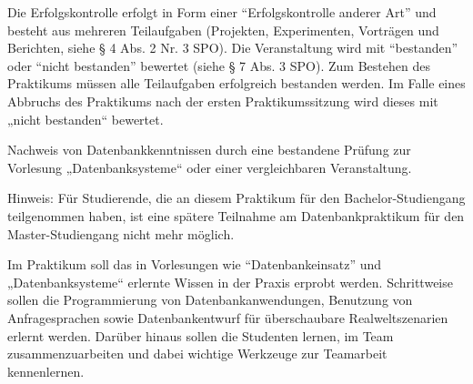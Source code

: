 \begin{course}

\setdoclanguagegerman
{}



\coursehead


\label{cour_14781.dp_997}


\begin{styleenv}
\begin{assessment}
Die Erfolgskontrolle erfolgt in Form einer “Erfolgskontrolle anderer Art” und besteht aus mehreren Teilaufgaben (Projekten, Experimenten, Vorträgen und Berichten, siehe § 4 Abs. 2 Nr. 3 SPO). Die Veranstaltung wird mit “bestanden” oder “nicht bestanden” bewertet (siehe § 7 Abs. 3 SPO). Zum Bestehen des Praktikums müssen alle Teilaufgaben erfolgreich bestanden werden. Im Falle eines Abbruchs des Praktikums nach der ersten Praktikumssitzung wird dieses mit „nicht bestanden“ bewertet.


\end{assessment}

\begin{conditions}Nachweis von Datenbankkenntnissen durch eine bestandene Prüfung zur Vorlesung „Datenbanksysteme“ oder einer vergleichbaren Veranstaltung.

 

Hinweis: Für Studierende, die an diesem Praktikum für den Bachelor-Studiengang teilgenommen haben, ist eine spätere Teilnahme am Datenbankpraktikum für den Master-Studiengang nicht mehr möglich.

\end{conditions}


\end{styleenv}

\begin{learningoutcomes}
Im Praktikum soll das in Vorlesungen wie “Datenbankeinsatz” und „Datenbanksysteme“ erlernte Wissen in der Praxis erprobt werden. Schrittweise sollen die Programmierung von Datenbankanwendungen, Benutzung von Anfragesprachen sowie Datenbankentwurf für überschaubare Realweltszenarien erlernt werden. Darüber hinaus sollen die Studenten lernen, im Team zusammenzuarbeiten und dabei wichtige Werkzeuge zur Teamarbeit kennenlernen.



\end{learningoutcomes}
\end{course}
